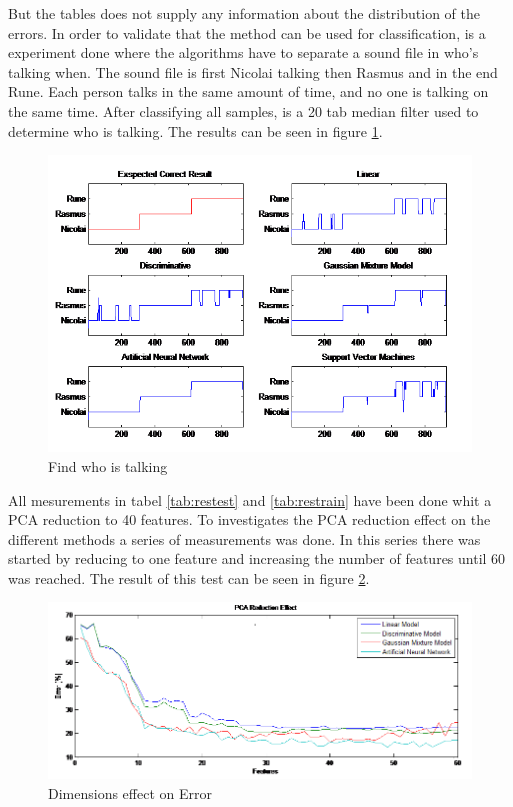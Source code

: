 But the tables does not supply any information about the distribution of the errors. In order to validate that the method can be used for classification, is a experiment done where the algorithms have to separate a sound file in who's talking when. The sound file is first Nicolai talking then Rasmus and in the end Rune. Each person talks in the same amount of time, and no one is talking on the same time.  After classifying all samples, is a 20 tab median filter used to determine who is talking. The results can be seen in figure \ref{fig:talktest}. 

\begin{figure}[H]
\centering
\includegraphics[scale=0.9]{billeder/TestedMethods}
\caption{ Find who is talking }
\label{fig:talktest}
\end{figure}

All mesurements in tabel \ref{tab:restest} and \ref{tab:restrain} have been done whit a PCA reduction to 40 features. To investigates the PCA reduction effect on the different methods a series of measurements was done. In this series there was started by reducing to one feature and increasing the number of features until 60 was reached. The result of this test can be seen in figure \ref{fig:DimError}.

\begin{figure}[H]
\centering
\includegraphics[scale=0.7]{billeder/PCAReductionEffect}
\caption{ Dimensions effect on Error }
\label{fig:DimError}
\end{figure}

